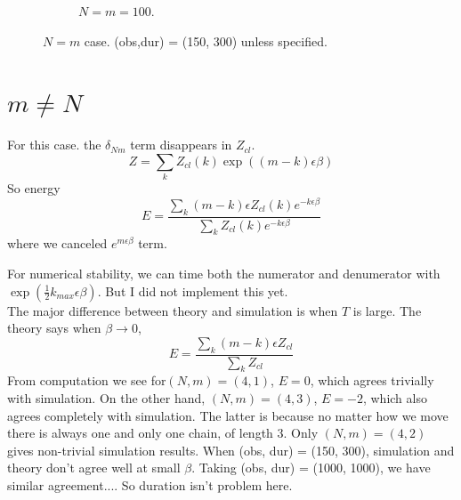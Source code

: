 \documentclass[12pt]{article}
\begin{document}
\begin{figure}
	\begin{subfigure}{.47\textwidth}
		\centering
		\caption{\(N=m=100\).}
		\label{fig:NN100}
	\end{subfigure}%
	
	\caption{\(N=m\) case. (obs,dur) = (150, 300) unless specified.}
	\label{fig_NN}
\end{figure}

\section{\(m \neq  N\)}
For this case. the \(\delta_{Nm}\) term disappears in \(Z_{cl}\). 
\[
Z = \sum_k Z_{cl}(k) \exp((m-k) \epsilon \beta)
\]
So energy
\[
E = \frac{ \sum_k (m-k) \epsilon Z_{cl}(k) e^{-k \epsilon \beta }} { \sum_k Z_{cl}(k) e^{-k\epsilon \beta}}
\]
where we canceled \(e^{m\epsilon \beta}\) term.

For numerical stability, we can time both the numerator and denumerator with \(\exp(\frac 1 2 k_{max} \epsilon \beta)\). But I did not implement this yet.\\

The major difference between theory and simulation is when \(T\) is large. The theory says when \(\beta \rightarrow 0\), 
\[
E = \frac {\sum_k(m-k)\epsilon Z_{cl} }  { \sum_k Z_{cl}}
\]
From computation we see for\((N,m) = (4,1)\), \(E = 0\), which agrees trivially with simulation. On the other hand, \((N,m) = (4,3)\), \(E=-2\), which also agrees completely with simulation. The latter is because no matter how we move there is always one and only one chain, of length 3.  Only \((N,m)=(4,2)\) gives non-trivial simulation results. When (obs, dur) = (150, 300), simulation and theory don't agree well at small \(\beta\). Taking (obs, dur) = (1000, 1000), we have similar agreement.... So duration isn't problem here.\\
\end{document}
